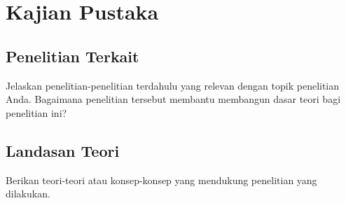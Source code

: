 \chapter{Kajian Pustaka}
\section{Penelitian Terkait}
Jelaskan penelitian-penelitian terdahulu yang relevan dengan topik penelitian Anda. Bagaimana penelitian tersebut membantu membangun dasar teori bagi penelitian ini?

\section{Landasan Teori}
Berikan teori-teori atau konsep-konsep yang mendukung penelitian yang dilakukan.
